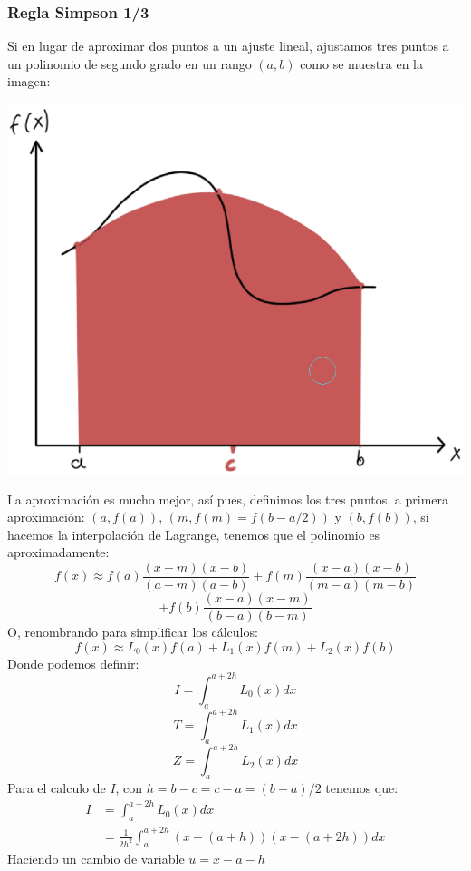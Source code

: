 \documentclass[10pt]{article}
\begin{document}
\begin{multicols}{2}
		\subsubsection{Regla Simpson 1/3}
		Si en lugar de aproximar dos puntos a un ajuste lineal, ajustamos tres puntos a un polinomio de segundo grado en un rango $(a,b)$ como se muestra en la imagen:
		\begin{center}
			\includegraphics[scale=0.2]{../Imagenes/3.png}
		\end{center}
		La aproximación es mucho mejor, así pues, definimos los tres puntos, a primera aproximación: $(a,f(a))$, $(m,f(m)=f(b-a/2))$ y $(b,f(b))$, si hacemos la interpolación de Lagrange, tenemos que el polinomio es aproximadamente:
		$$f(x)\approx f(a){\frac {(x-m)(x-b)}{(a-m)(a-b)}}+f(m){\frac {(x-a)(x-b)}{(m-a)(m-b)}}$$
		$$+f(b){\frac {(x-a)(x-m)}{(b-a)(b-m)}}$$
		O, renombrando para simplificar los cálculos:
		$$f(x)\approx L_0(x)f(a)+L_1(x)f(m)+L_2(x)f(b)$$
		Donde podemos definir:
		$$I=\int_a^{a+2h}L_0(x)dx$$
		$$T=\int_a^{a+2h}L_1(x)dx$$
		$$Z=\int_a^{a+2h}L_2(x)dx$$
		Para el calculo de $I$, con $h=b-c=c-a=(b-a)/2$ tenemos que:
		\begin{equation*}
			\begin{split}
				I&=\int_a^{a+2h}L_0(x) dx \\
				 &=\frac{1}{2h^2}\int_a^{a+2h}(x-(a+h))(x-(a+2h))dx
			\end{split}
		\end{equation*}
		Haciendo un cambio de variable $u=x-a-h$
		\begin{equation*}

\end{equation*}
\end{multicols}
\end{document}
